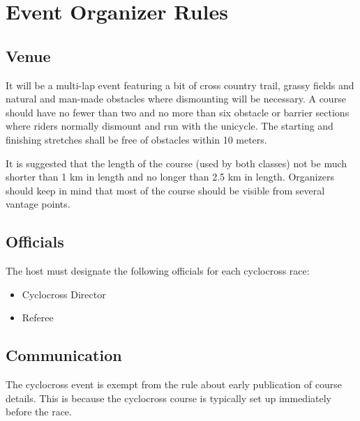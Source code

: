\chapter{Event Organizer Rules}

\section{Venue}

It will be a multi-lap event featuring a bit of cross country trail, grassy fields and natural and man-made obstacles where dismounting will be necessary.
A course should have no fewer than two and no more than six obstacle or barrier sections where riders normally dismount and run with the unicycle.
The starting and finishing stretches shall be free of obstacles within 10 meters.

It is suggested that the length of the course (used by both classes) not be much shorter than 1 km in length and no longer than 2.5 km in length. 
Organizers should keep in mind that most of the course should be visible from several vantage points.

\section{Officials}

The host must designate the following officials for each cyclocross race:
\begin{itemize}
\item Cyclocross Director
\item Referee
\end{itemize}

\section{Communication}

\begin{comment2016}
Some thoughts on what might need to be communicated:
\begin{itemize}
\item age groups
\item results
\end{itemize}
}
\end{comment2016}

The cyclocross event is exempt from the rule about early publication of course details. This is because the cyclocross course is typically set up immediately before the race.

